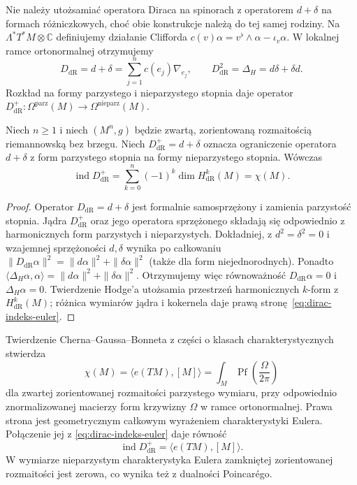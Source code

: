 Nie należy utożsamiać operatora Diraca na spinorach
z operatorem $d+\delta$ na formach różniczkowych,
choć obie konstrukcje należą do tej samej rodziny.
Na $\Lambda^*T^*M\otimes\mathbb C$ definiujemy
działanie Clifforda
$c(v)\alpha=v^\flat\wedge\alpha-\iota_v\alpha$.
W lokalnej ramce ortonormalnej otrzymujemy
\begin{equation}\label{eq:dirac-de-rham}
 D_{\mathrm{dR}}=d+\delta
 =\sum_{j=1}^n c(e_j)\nabla_{e_j},
 \qquad D_{\mathrm{dR}}^2=\Delta_H=d\delta+\delta d.
\end{equation}
Rozkład na formy parzystego i nieparzystego stopnia
daje operator $D_{\mathrm{dR}}^+:\Omega^{\mathrm{parz}}(M)
\to\Omega^{\mathrm{nieparz}}(M)$.

\begin{stwierdzenie}
\label{prop:dirac-indeks-euler}
Niech $n\geq1$ i niech $(M^n,g)$ będzie zwartą,
zorientowaną rozmaitością riemannowską bez brzegu.
Niech $D_{\mathrm{dR}}^+=d+\delta$ oznacza ograniczenie
operatora $d+\delta$ z form parzystego stopnia
na formy nieparzystego stopnia. Wówczas
\begin{equation}\label{eq:dirac-indeks-euler}
 \operatorname{ind}D_{\mathrm{dR}}^+
 =\sum_{k=0}^n(-1)^k\dim H^k_{\mathrm{dR}}(M)
 =\chi(M).
\end{equation}
\end{stwierdzenie}
\begin{proof}
Operator $D_{\mathrm{dR}}=d+\delta$ jest formalnie
samosprzężony i zamienia parzystość stopnia.
Jądra $D_{\mathrm{dR}}^+$ oraz jego operatora
sprzężonego składają się odpowiednio z harmonicznych
form parzystych i nieparzystych. Dokładniej,
z $d^2=\delta^2=0$ i wzajemnej sprzężoności
$d,\delta$ wynika po całkowaniu
$\|D_{\mathrm{dR}}\alpha\|^2
=\|d\alpha\|^2+\|\delta\alpha\|^2$
(także dla form niejednorodnych). Ponadto
$\langle\Delta_H\alpha,\alpha\rangle
=\|d\alpha\|^2+\|\delta\alpha\|^2$.
Otrzymujemy więc równoważność
$D_{\mathrm{dR}}\alpha=0$
i $\Delta_H\alpha=0$.
Twierdzenie Hodge'a utożsamia przestrzeń harmonicznych
$k$-form z $H^k_{\mathrm{dR}}(M)$; różnica wymiarów
jądra i kokernela daje prawą stronę~\eqref{eq:dirac-indeks-euler}.
\end{proof}

Twierdzenie Cherna--Gaussa--Bonneta z części o
klasach charakterystycznych stwierdza
\begin{equation}\label{eq:dirac-chern-gauss-bonnet}
 \chi(M)=\langle e(TM),[M]\rangle
 =\int_M\operatorname{Pf}\!\left(\frac{\Omega}{2\pi}\right)
\end{equation}
dla zwartej zorientowanej rozmaitości parzystego
wymiaru, przy odpowiednio znormalizowanej macierzy
form krzywizny $\Omega$ w ramce ortonormalnej.
Prawa strona jest geometrycznym całkowym wyrażeniem
charakterystyki Eulera. Połączenie jej z
\eqref{eq:dirac-indeks-euler} daje równość
\[
 \operatorname{ind}D_{\mathrm{dR}}^+
 =\langle e(TM),[M]\rangle.
\]
W wymiarze nieparzystym charakterystyka Eulera
zamkniętej zorientowanej rozmaitości jest zerowa,
co wynika też z dualności Poincarégo.

